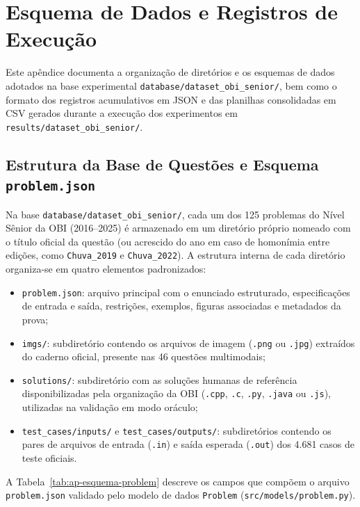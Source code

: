 \chapter{Esquema de Dados e Registros de Execução}\label{ap:esquema-dados}

Este apêndice documenta a organização de diretórios e os esquemas de dados adotados na base experimental \texttt{database/\allowbreak dataset\_obi\_senior/}, bem como o formato dos registros acumulativos em JSON e das planilhas consolidadas em CSV gerados durante a execução dos experimentos em \texttt{results/\allowbreak dataset\_obi\_senior/}.

\section{Estrutura da Base de Questões e Esquema \texttt{problem.json}}\label{ap:esquema-problem}

Na base \texttt{database/\allowbreak dataset\_obi\_senior/}, cada um dos 125 problemas do Nível Sênior da OBI (2016--2025) é armazenado em um diretório próprio nomeado com o título oficial da questão (ou acrescido do ano em caso de homonímia entre edições, como \texttt{Chuva\_2019} e \texttt{Chuva\_2022}). A estrutura interna de cada diretório organiza-se em quatro elementos padronizados:

\begin{itemize}
    \item \texttt{problem.json}: arquivo principal com o enunciado estruturado, especificações de entrada e saída, restrições, exemplos, figuras associadas e metadados da prova;
    \item \texttt{imgs/}: subdiretório contendo os arquivos de imagem (\texttt{.png} ou \texttt{.jpg}) extraídos do caderno oficial, presente nas 46 questões multimodais;
    \item \texttt{solutions/}: subdiretório com as soluções humanas de referência disponibilizadas pela organização da OBI (\texttt{.cpp}, \texttt{.c}, \texttt{.py}, \texttt{.java} ou \texttt{.js}), utilizadas na validação em modo oráculo;
    \item \texttt{test\_cases/inputs/} e \texttt{test\_cases/outputs/}: subdiretórios contendo os pares de arquivos de entrada (\texttt{.in}) e saída esperada (\texttt{.out}) dos 4.681 casos de teste oficiais.
\end{itemize}

A Tabela~\ref{tab:ap-esquema-problem} descreve os campos que compõem o arquivo \texttt{problem.json} validado pelo modelo de dados \texttt{Problem} (\texttt{src/models/problem.py}).

